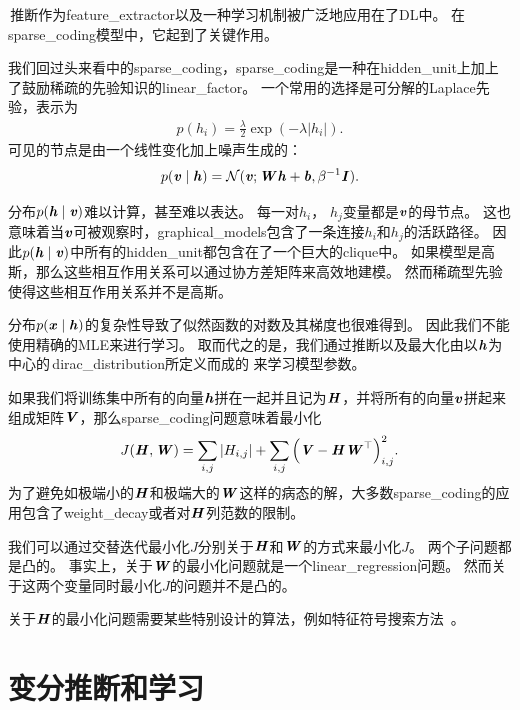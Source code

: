 \,推断作为\gls{feature_extractor}以及一种学习机制被广泛地应用在了\gls{DL}中。
在\gls{sparse_coding}模型中，它起到了关键作用。


我们回过头来看中的\gls{sparse_coding}，\gls{sparse_coding}是一种在\gls{hidden_unit}上加上了鼓励稀疏的先验知识的\gls{linear_factor}。
一个常用的选择是可分解的Laplace先验，表示为
\begin{align}
	p(h_i) = \frac{\lambda}{2}  \exp(-\lambda \vert h_i \vert).
\end{align}
可见的节点是由一个线性变化加上噪声生成的：
\begin{align}
p(\boldsymbol{\mathit{v}}\mid\boldsymbol{\mathit{h}}) = \mathcal{N}(\boldsymbol{\mathit{v}};{\boldsymbol{\mathit{W}}}\boldsymbol{\mathit{h}} + \boldsymbol{\mathit{b}},\beta^{-1}{\boldsymbol{\mathit{I}}}).
\end{align}


分布$p(\boldsymbol{\mathit{h}}\mid\boldsymbol{\mathit{v}})$难以计算，甚至难以表达。
每一对$h_i$， $h_j$变量都是$\boldsymbol{\mathit{v}}$的母节点。
这也意味着当$\boldsymbol{\mathit{v}}$可被观察时，\gls{graphical_models}包含了一条连接$h_i$和$h_j$的活跃路径。
因此$p(\boldsymbol{\mathit{h}} \mid\boldsymbol{\mathit{v}})$中所有的\gls{hidden_unit}都包含在了一个巨大的\gls{clique}中。
如果模型是高斯，那么这些相互作用关系可以通过协方差矩阵来高效地建模。
然而稀疏型先验使得这些相互作用关系并不是高斯。


分布$p(\boldsymbol{\mathit{x}}\mid\boldsymbol{\mathit{h}})$的复杂性导致了似然函数的对数及其梯度也很难得到。
因此我们不能使用精确的\gls{MLE}来进行学习。
取而代之的是，我们通过推断以及最大化由以$\boldsymbol{\mathit{h}}$为中心的\,\gls{dirac_distribution}所定义而成的\,\,来学习模型参数。


如果我们将训练集中所有的向量$\boldsymbol{\mathit{h}}$拼在一起并且记为$\boldsymbol{\mathit{H}}$，并将所有的向量$\boldsymbol{\mathit{v}}$拼起来组成矩阵$\boldsymbol{\mathit{V}}$，那么\gls{sparse_coding}问题意味着最小化
\begin{align}
	J(\boldsymbol{\mathit{H}},\boldsymbol{\mathit{W}}) = \sum_{i,j}^{}\vert H_{i,j}\vert + \sum_{i,j}^{}\Big(\boldsymbol{\mathit{V}} - \boldsymbol{\mathit{H}} \boldsymbol{\mathit{W}}^{\top}\Big)^2_{i,j}.
\end{align}
为了避免如极端小的$\boldsymbol{\mathit{H}}$和极端大的$\boldsymbol{\mathit{W}}$这样的病态的解，大多数\gls{sparse_coding}的应用包含了\gls{weight_decay}或者对$\boldsymbol{\mathit{H}}$列范数的限制。


我们可以通过交替迭代最小化$J$分别关于$\boldsymbol{\mathit{H}}$和$\boldsymbol{\mathit{W}}$的方式来最小化$J$。
两个子问题都是凸的。
事实上，关于$\boldsymbol{\mathit{W}}$的最小化问题就是一个\gls{linear_regression}问题。
然而关于这两个变量同时最小化$J$的问题并不是凸的。


关于$\boldsymbol{\mathit{H}}$的最小化问题需要某些特别设计的算法，例如特征符号搜索方法~\citep{HonglakLee-2007}。


\section{变分推断和学习}
\label{sec:variational_inference_and_learning}


